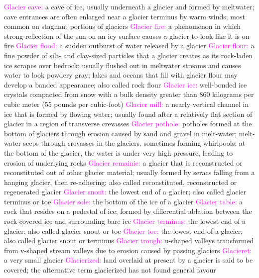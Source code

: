 \documentclass{article}
\newcommand{\pink}[1]{\textcolor{magenta}{#1}}
\newcommand{\vocab}[1]{{\pink{#1}}}
\begin{document}
\begin{multicols*}{4}
		\vocab{        Glacier cave: } a cave of ice, usually underneath a glacier and formed by meltwater; cave entrances are often enlarged near a glacier terminus by warm winds; most common on stagnant portions of glaciers 
		\vocab{        Glacier fire: } a phenomenon in which strong reflection of the sun on an icy surface causes a glacier to look like it is on fire 
		\vocab{        Glacier flood: } a sudden outburst of water released by a glacier 
		\vocab{        Glacier flour: } a fine powder of silt- and clay-sized particles that a glacier creates as its rock-laden ice scrapes over bedrock; usually flushed out in meltwater streams and causes water to look powdery gray; lakes and oceans that fill with glacier flour may develop a banded appearance; also called rock flour 
		\vocab{        Glacier ice: } well-bonded ice crystals compacted from snow with a bulk density greater than 860 kilograms per cubic meter (55 pounds per cubic-foot) 
		\vocab{        Glacier mill: } a nearly vertical channel in ice that is formed by flowing water; usually found after a relatively flat section of glacier in a region of transverse crevasses 
		\vocab{        Glacier pothole: } potholes formed at the bottom of glaciers through erosion caused by sand and gravel in melt-water; melt-water seeps through crevasses in the glaciers, sometimes forming whirlpools; at the bottom of the glacier, the water is under very high pressure, leading to erosion of underlying rocks 
		\vocab{        Glacier remainie: } a glacier that is reconstructed or reconstituted out of other glacier material; usually formed by seracs falling from a hanging glacier, then re-adhering; also called reconstituted, reconstructed or regenerated glacier 
		\vocab{        Glacier snout: } the lowest end of a glacier; also called glacier terminus or toe 
		\vocab{        Glacier sole: } the bottom of the ice of a glacier 
		\vocab{        Glacier table: } a rock that resides on a pedestal of ice; formed by differential ablation between the rock-covered ice and surrounding bare ice 
		\vocab{        Glacier terminus: } the lowest end of a glacier; also called glacier snout or toe 
		\vocab{        Glacier toe: } the lowest end of a glacier; also called glacier snout or terminus 
		\vocab{        Glacier trough: } u-shaped valleys transformed from v-shaped stream valleys due to erosion caused by passing glaciers 
		\vocab{        Glacieret: } a very small glacier 
		\vocab{        Glacierized: } land overlaid at present by a glacier is said to be covered; the alternative term glacierized has not found general favour 

\end{multicols*}
\end{document}
